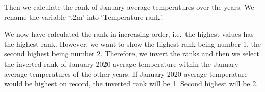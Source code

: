 \documentclass[letterpaper,10pt,english]{sphinxmanual}
\begin{document}
Then we calculate the rank of January average temperatures over the years. We rename the variable ‘t2m’ into ‘Temperature rank’.

{
\begin{sphinxVerbatim}[commandchars=\\\{\}]
\llap{\color{nbsphinxin}[16]:\,\hspace{\fboxrule}\hspace{\fboxsep}}  \PYG{p}{[}\PYG{p}{]}  
  
\end{sphinxVerbatim}
}

We now have calculated the rank in increasing order, i.e. the highest values has the highest rank. However, we want to show the highest rank being number 1, the second highest being number 2. Therefore, we invert the ranks and then we select the inverted rank of January 2020 average temperature within the January average temperatures of the other years. If January 2020 average temperature would be highest on record, the inverted rank will be 1. Second highest will be 2.

{
\begin{sphinxVerbatim}[commandchars=\\\{\}]
\llap{\color{nbsphinxin}[17]:\,\hspace{\fboxrule}\hspace{\fboxsep}}      
\end{sphinxVerbatim}
}
\end{document}
